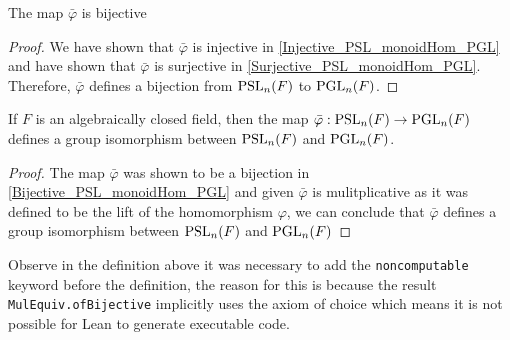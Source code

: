 \begin{lemma}
\label{Bijective_PSL_monoidHom_PGL}
\leanok
    The map $\bar{\varphi}$ is bijective
\end{lemma}
\begin{proof}
\leanok
 We have shown that $\bar{\varphi}$ is injective in \ref{Injective_PSL_monoidHom_PGL} and have shown that $\bar{\varphi}$ is surjective in \ref{Surjective_PSL_monoidHom_PGL}. 
 Therefore, $\bar{\varphi}$ defines a bijection from $\operatorname{PSL}_n(F)$ to $\operatorname{PGL}_n(F)$.
\end{proof}


\begin{theorem}
\label{PGL_iso_PSL}
\leanok
    If $F$ is an algebraically closed field, then the map $\bar{\varphi} : \operatorname{PSL}_n(F) \rightarrow \operatorname{PGL}_n(F)$ defines a group isomorphism between $\operatorname{PSL}_n(F)$ and $\operatorname{PGL}_n(F)$.
\end{theorem}

\begin{proof}
\leanok
    The map $\bar{\varphi}$ was shown to be a bijection in \ref{Bijective_PSL_monoidHom_PGL} and given $\bar{\varphi}$ is mulitplicative as it was defined to be the lift of the homomorphism $\varphi$, we can conclude that 
    $\bar{\varphi}$ defines a group isomorphism between $\operatorname{PSL}_n(F)$ and $\operatorname{PGL}_n(F)$
\end{proof}


\begin{remark}[Noncomputable]
    Observe in the definition above it was necessary to add the \texttt{noncomputable} keyword before the definition, the reason for this is
    because the result \texttt{MulEquiv.ofBijective} implicitly uses the axiom of choice which means it is not possible for Lean to generate
    executable code.
\end{remark}




